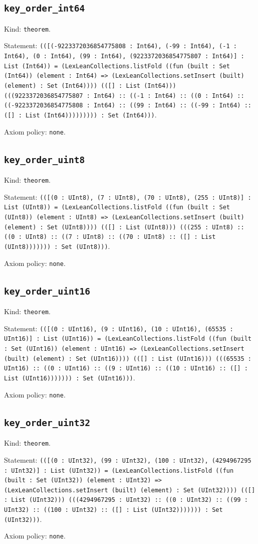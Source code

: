 \documentclass[11pt]{article}
\begin{document}
\subsection*{\texttt{key\_order\_int64}}
\noindent Kind: \texttt{theorem}.\par
\noindent Statement: \texttt{(([(-9223372036854775808 : Int64), (-99 : Int64), (-1 : Int64), (0 : Int64), (99 : Int64), (9223372036854775807 : Int64)] : List (Int64)) = (LexLeanCollections.listFold ((fun (built : Set (Int64)) (element : Int64) => (LexLeanCollections.setInsert (built) (element) : Set (Int64)))) (([] : List (Int64))) (((9223372036854775807 : Int64) :: ((-1 : Int64) :: ((0 : Int64) :: ((-9223372036854775808 : Int64) :: ((99 : Int64) :: ((-99 : Int64) :: ([] : List (Int64))))))))) : Set (Int64)))}.\par
\noindent Axiom policy: \texttt{none}.\par
\subsection*{\texttt{key\_order\_uint8}}
\noindent Kind: \texttt{theorem}.\par
\noindent Statement: \texttt{(([(0 : UInt8), (7 : UInt8), (70 : UInt8), (255 : UInt8)] : List (UInt8)) = (LexLeanCollections.listFold ((fun (built : Set (UInt8)) (element : UInt8) => (LexLeanCollections.setInsert (built) (element) : Set (UInt8)))) (([] : List (UInt8))) (((255 : UInt8) :: ((0 : UInt8) :: ((7 : UInt8) :: ((70 : UInt8) :: ([] : List (UInt8))))))) : Set (UInt8)))}.\par
\noindent Axiom policy: \texttt{none}.\par
\subsection*{\texttt{key\_order\_uint16}}
\noindent Kind: \texttt{theorem}.\par
\noindent Statement: \texttt{(([(0 : UInt16), (9 : UInt16), (10 : UInt16), (65535 : UInt16)] : List (UInt16)) = (LexLeanCollections.listFold ((fun (built : Set (UInt16)) (element : UInt16) => (LexLeanCollections.setInsert (built) (element) : Set (UInt16)))) (([] : List (UInt16))) (((65535 : UInt16) :: ((0 : UInt16) :: ((9 : UInt16) :: ((10 : UInt16) :: ([] : List (UInt16))))))) : Set (UInt16)))}.\par
\noindent Axiom policy: \texttt{none}.\par
\subsection*{\texttt{key\_order\_uint32}}
\noindent Kind: \texttt{theorem}.\par
\noindent Statement: \texttt{(([(0 : UInt32), (99 : UInt32), (100 : UInt32), (4294967295 : UInt32)] : List (UInt32)) = (LexLeanCollections.listFold ((fun (built : Set (UInt32)) (element : UInt32) => (LexLeanCollections.setInsert (built) (element) : Set (UInt32)))) (([] : List (UInt32))) (((4294967295 : UInt32) :: ((0 : UInt32) :: ((99 : UInt32) :: ((100 : UInt32) :: ([] : List (UInt32))))))) : Set (UInt32)))}.\par
\noindent Axiom policy: \texttt{none}.\par
\end{document}
